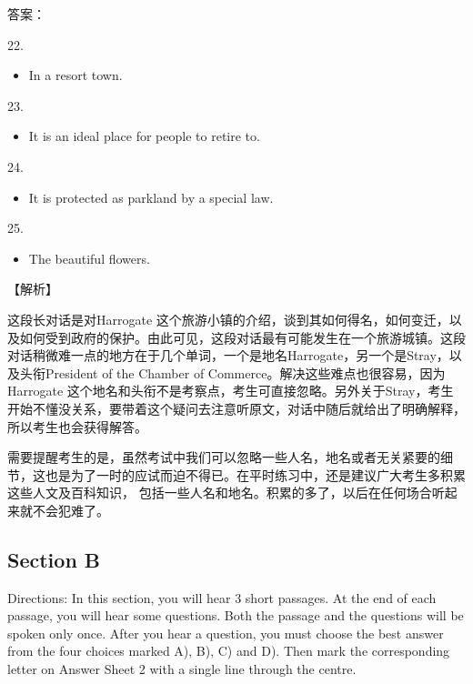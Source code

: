 \documentclass[UTF8,11pt]{ctexart}
\begin{document}
答案：


22.


\begin{itemize}[leftmargin=2em,itemsep=.2em,topsep=.4em]\item[B.] In a resort town.
\end{itemize}

23.


\begin{itemize}[leftmargin=2em,itemsep=.2em,topsep=.4em]\item[D.] It is an ideal place for people to retire to.
\end{itemize}

24.


\begin{itemize}[leftmargin=2em,itemsep=.2em,topsep=.4em]\item[D.] It is protected as parkland by a special law.
\end{itemize}

25.


\begin{itemize}[leftmargin=2em,itemsep=.2em,topsep=.4em]\item[C.] The beautiful flowers.
\end{itemize}

【解析】


这段长对话是对Harrogate 这个旅游小镇的介绍，谈到其如何得名，如何变迁，以及如何受到政府的保护。由此可见，这段对话最有可能发生在一个旅游城镇。这段对话稍微难一点的地方在于几个单词，一个是地名Harrogate，另一个是Stray，以及头衔President of the Chamber of Commerce。解决这些难点也很容易，因为Harrogate 这个地名和头衔不是考察点，考生可直接忽略。另外关于Stray，考生开始不懂没关系，要带着这个疑问去注意听原文，对话中随后就给出了明确解释，所以考生也会获得解答。


需要提醒考生的是，虽然考试中我们可以忽略一些人名，地名或者无关紧要的细节，这也是为了一时的应试而迫不得已。在平时练习中，还是建议广大考生多积累这些人文及百科知识， 包括一些人名和地名。积累的多了，以后在任何场合听起来就不会犯难了。


\subsection*{\textbf{Section B}}


Directions: In this section, you will hear 3 short passages. At the end of each passage, you will hear some questions. Both the passage and the questions will be spoken only once. After you hear a question, you must choose the best answer from the four choices marked A), B), C) and D). Then mark the corresponding letter on Answer Sheet 2 with a single line through the centre.
\end{document}
